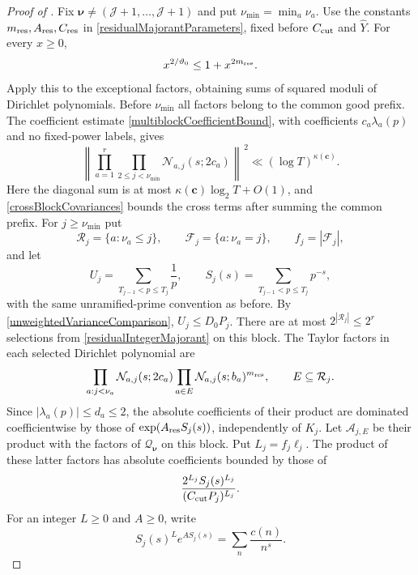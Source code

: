 \documentclass[oneside, 12pt]{amsart}
\theoremstyle{definition}
\begin{document}
{		\begin{proof}[Proof of ]
			Fix $\boldsymbol\nu\neq
			(\mathscr J+1,\ldots,\mathscr J+1)$ and put
			$\nu_{\min}=\min_a\nu_a$.  Use the constants
			$m_{\rm res},A_{\rm res},C_{\rm res}$ in
			\eqref{residualMajorantParameters}, fixed before $C_{\rm cut}$ and
			$\widehat Y$.  For every $x\geq0$,
			\begin{equation}\label{residualIntegerMajorant}
				x^{2/\vartheta_0}\leq1+x^{2m_{\rm res}}.
			\end{equation}
			Apply this to the exceptional factors, obtaining sums of squared moduli
			of Dirichlet polynomials.
			Before $\nu_{\min}$ all factors belong to the common good prefix.
			The coefficient estimate \eqref{multiblockCoefficientBound}, with
			coefficients $c_a\lambda_a(p)$ and no fixed-power labels, gives
			\begin{equation}\label{residualCommonPrefixNorm}
				\left\|
				\prod_{a=1}^r\prod_{2\leq j<\nu_{\min}}
				\mathcal N_{a,j}(s;2c_a)
				\right\|^{\,2}
				\ll(\log T)^{\kappa(\boldsymbol c)}.
			\end{equation}
			Here the diagonal sum is at most $\kappa(\boldsymbol c)\log_2T+O(1)$,
			and \eqref{crossBlockCovariances} bounds the cross terms after summing
			the common prefix.
			For $j\geq\nu_{\min}$ put
			\[
			\mathcal R_j=\{a:\nu_a\leq j\},\qquad
			\mathcal F_j=\{a:\nu_a=j\},\qquad f_j=|\mathcal F_j|,
			\]
			and let
			\[
			U_j=\sum_{T_{j-1}<p\leq T_j}\frac1p,\qquad
			S_j(s)=\sum_{T_{j-1}<p\leq T_j}p^{-s},
			\]
			with the same unramified-prime convention as before.  By
			\eqref{unweightedVarianceComparison}, $U_j\leq D_0P_j$.
			There are at most $2^{|\mathcal R_j|}\leq2^r$ selections from
			\eqref{residualIntegerMajorant} on this block. The Taylor factors in
			each selected Dirichlet polynomial are
			\[
			\prod_{a:j<\nu_a}\mathcal N_{a,j}(s;2c_a)
			\prod_{a\in E}\mathcal N_{a,j}(s;b_a)^{m_{\rm res}},
			\qquad E\subseteq\mathcal R_j.
			\]
			Since $|\lambda_a(p)|\leq d_a\leq2$, the absolute coefficients of their product
			are dominated coefficientwise by those of
			$\exp(A_{\rm res}S_j(s))$, independently of $K_j$.
			Let $\mathcal A_{j,E}$ be their product with the factors of
			$\mathcal Q_{\boldsymbol\nu}$ on this block. Put $L_j=f_j\ell_j$.
			The product of these latter factors has absolute coefficients bounded by those of
			\[
			\frac{2^{L_j}S_j(s)^{L_j}}
			{(C_{\rm cut}P_j)^{L_j}}.
			\]
			For an integer $L\geq0$ and $A\geq0$, write
			\[
			S_j(s)^L e^{AS_j(s)}=\sum_n\frac{c(n)}{n^s}.
\]
\end{proof}}
\end{document}
